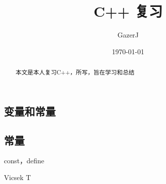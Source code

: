\documentclass{article}
\begin{document}
\begin{CJK}{UTF8}{gkai}

\title{C++ 复习 }
\author{ GazerJ}
\date{\today}
\maketitle
\begin{abstract}
	本文是本人复习C++，所写，旨在学习和总结
\end{abstract}

\section{变量和常量}


\subsection{常量}
 	const，define



\begin{thebibliography}{12345}%
 Vicsek T


\end{thebibliography}
\end{CJK}
\end{document}
